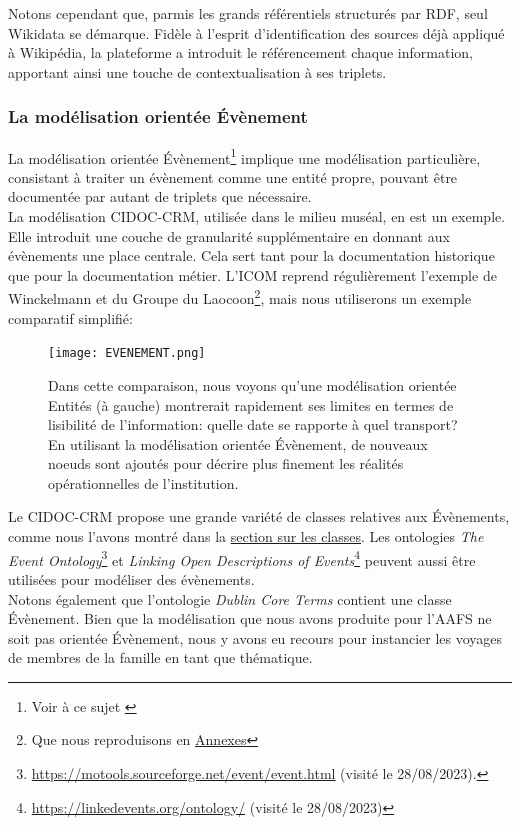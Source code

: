 \documentclass[a4paper,12pt,twoside]{book}
\begin{document}
Notons cependant que, parmis les grands référentiels structurés par RDF, seul Wikidata se démarque. Fidèle à l'esprit d'identification des sources déjà appliqué à Wikipédia, la plateforme a introduit le référencement chaque information, apportant ainsi une touche de contextualisation à ses triplets. 

\subsubsection{La \og modélisation orientée Évènement\fg}\label{mod-evenement}
La modélisation orientée Évènement\footnote{Voir à ce sujet \cite{poupeauQuelEvenementOu2010}} implique une modélisation particulière, consistant à traiter un évènement comme une entité propre, pouvant être documentée par autant de triplets que nécessaire.\\

La modélisation CIDOC-CRM, utilisée dans le milieu muséal, en est un exemple. Elle introduit une couche de granularité supplémentaire en donnant aux évènements une place centrale. Cela sert tant pour la documentation historique que pour la documentation métier. L'ICOM reprend régulièrement l'exemple de Winckelmann et du Groupe du Laocoon\footnote{Que nous reproduisons en \hyperref[model-cidoc-crm]{Annexes}}, mais nous utiliserons un exemple comparatif simplifié:
 \begin{figure}[h]
    \centering
    \texttt{[image: EVENEMENT.png]}
    \caption{Dans cette comparaison, nous voyons qu'une modélisation orientée Entités (à gauche) montrerait rapidement ses limites en termes de lisibilité de l'information: quelle date se rapporte à quel transport? En utilisant la modélisation orientée Évènement, de nouveaux noeuds sont ajoutés pour décrire plus finement les réalités opérationnelles de l'institution.}
    \label{fig:enter-label}
\end{figure}

Le CIDOC-CRM propose une grande variété de classes relatives aux Évènements, comme nous l'avons montré dans la \hyperref[1-classes]{section sur les classes}. Les ontologies \textit{The Event Ontology}\footnote{\url{https://motools.sourceforge.net/event/event.html} (visité le 28/08/2023).} et \textit{Linking Open Descriptions of Events}\footnote{\url{https://linkedevents.org/ontology/} (visité le 28/08/2023)} peuvent aussi être utilisées pour modéliser des évènements.\\

Notons également que l'ontologie \textit{Dublin Core Terms} contient une classe Évènement. Bien que la modélisation que nous avons produite pour l'AAFS ne soit pas orientée Évènement, nous y avons eu recours pour instancier les voyages de membres de la famille en tant que thématique.\\
\end{document}
